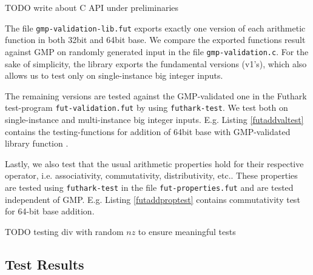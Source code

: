 {\color{red} TODO write about C API under preliminaries}

The file \texttt{gmp-validation-lib.fut} exports exactly one version of each arithmetic function in both 32bit and 64bit base. We compare the exported functions result against GMP on randomly generated input in the file \texttt{gmp-validation.c}. For the sake of simplicity, the library exports the fundamental versions (v1's), which also allows us to test only on single-instance big integer inputs.

The remaining versions are tested against the GMP-validated one in the Futhark test-program \texttt{fut-validation.fut} by using \texttt{futhark-test}. We test both on single-instance and multi-instance big integer inputs. E.g. Listing \ref{futaddvaltest} contains the testing-functions for addition of 64bit base with GMP-validated library function .



Lastly, we also test that the usual arithmetic properties hold for their respective operator, i.e. associativity, commutativity, distributivity, etc.. These properties are tested using \texttt{futhark-test} in the file \texttt{fut-properties.fut} and are tested independent of GMP. E.g. Listing \ref{futaddproptest} contains commutativity test for 64-bit base addition.



{\color{red} TODO testing div with random $nz$ to ensure meaningful tests}

\subsection{Test Results}


